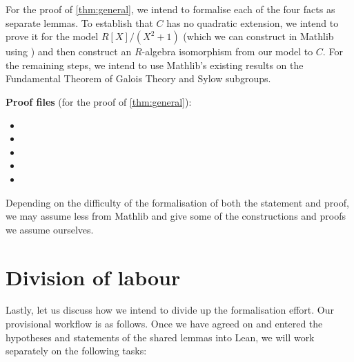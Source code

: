 \documentclass{article}
\begin{document}
For the proof of \cref{thm:general}, we intend to formalise each of the four facts as separate lemmas. To establish that $C$ has no quadratic extension, we intend to prove it for the model $R[X]/(X^2+1)$ (which we can construct in Mathlib using ) and then construct an $R$-algebra isomorphism from our model to $C$. For the remaining steps, we intend to use Mathlib's existing results on the Fundamental Theorem of Galois Theory and Sylow subgroups.

\textbf{Proof files} (for the proof of \cref{thm:general}):
\begin{itemize}[nosep]
\item {}
\item {}
\item {}
\item {}
\item {}
\end{itemize}

Depending on the difficulty of the formalisation of both the statement and proof, we may assume less from Mathlib and give some of the constructions and proofs we assume ourselves.

\section*{Division of labour}

Lastly, let us discuss how we intend to divide up the formalisation effort. Our provisional workflow is as follows. Once we have agreed on and entered the hypotheses and statements of the shared lemmas into Lean, we will work separately on the following tasks:
\end{document}
